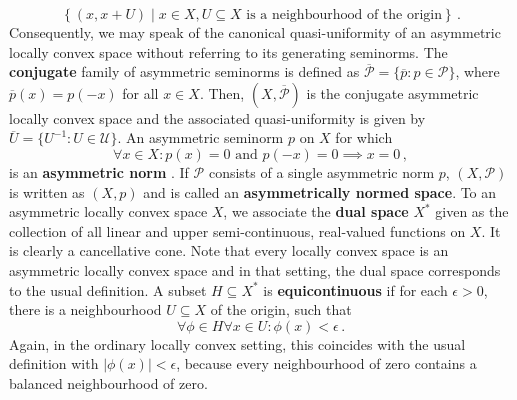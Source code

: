 \documentclass[
	paper=A4,
	pagesize=auto,
	fontsize=12pt
]{scrartcl}
\theoremstyle{plain}
\theoremstyle{remark}
\theoremstyle{definition}
\begin{document}
%
\begin{equation}
\left\{ \left( x, x + U \right) \middle| x \in X, U \subseteq X \text{ is a neighbourhood of the origin} \right\} \, .
\end{equation}
%
Consequently, we may speak of the canonical quasi-uniformity of an asymmetric locally convex space without referring to its generating seminorms.
The \textbf{conjugate} family of asymmetric seminorms is defined as $\overline{\mathcal{P}} = \{ \overline{p} : p \in \mathcal{P} \}$, where $\overline{p}(x) = p(-x)$ for all $x \in X$.
Then, $(X, \overline{\mathcal{P}})$ is the conjugate asymmetric locally convex space and the associated quasi-uniformity is given by $\overline{U} = \{ U^{-1} : U \in \mathcal{U} \}$.
An asymmetric seminorm $p$ on $X$ for which
%
\begin{equation}
\forall x \in X : p(x) = 0 \text{ and } p(-x) = 0 \implies x = 0 \, ,
\end{equation}
%
is an \textbf{asymmetric norm} \cite[Section 1.1.1]{src:Cobzaş:FunctionalAnalysisinAsymmetricNormedSpaces}.
If $\mathcal{P}$ consists of a single asymmetric norm $p$, $(X, \mathcal{P})$ is written as $(X, p)$ and is called an \textbf{asymmetrically normed space}.
To an asymmetric locally convex space $X$, we associate the \textbf{dual space} $X^*$ given as the collection of all linear and upper semi-continuous, real-valued functions on $X$.
It is clearly a cancellative cone.
Note that every locally convex space is an asymmetric locally convex space and in that setting, the dual space corresponds to the usual definition.
A subset $H \subseteq X^*$ is \textbf{equicontinuous} if for each $\epsilon > 0$, there is a neighbourhood $U \subseteq X$ of the origin, such that
%
\begin{equation}
\forall \phi \in H \forall x \in U : \phi \left( x \right) < \epsilon \, .
\end{equation}
%
Again, in the ordinary locally convex setting, this coincides with the usual definition with $\vert \phi(x) \vert < \epsilon$, because every neighbourhood of zero contains a balanced neighbourhood of zero.
\end{document}
